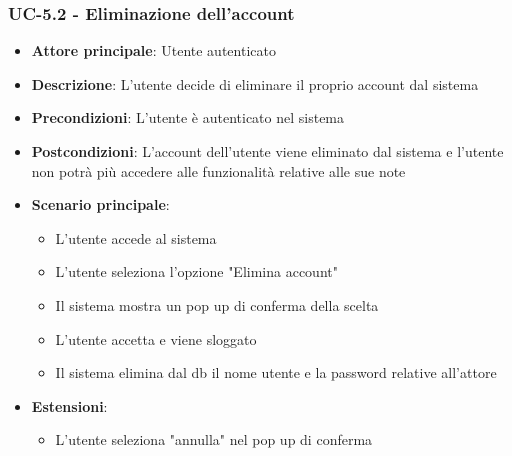 \documentclass[11pt,a4paper]{article}
\begin{document}
\subsubsection{UC-5.2 - Eliminazione dell'account}
\begin{itemize}
    \item \textbf{Attore principale}: Utente autenticato
    \item \textbf{Descrizione}: L'utente decide di eliminare il proprio account dal sistema
    \item \textbf{Precondizioni}: L'utente è autenticato nel sistema
    \item \textbf{Postcondizioni}: L'account dell'utente viene eliminato dal sistema e l'utente non potrà più accedere alle funzionalità relative alle sue note
    \item \textbf{Scenario principale}:
        \begin{itemize}
            \item L'utente accede al sistema
            \item L'utente seleziona l'opzione "Elimina account"
            \item Il sistema mostra un pop up di conferma della scelta
            \item L'utente accetta e viene sloggato
            \item Il sistema elimina dal db il nome utente e la password relative all'attore
        \end{itemize}
    \item \textbf{Estensioni}:
        \begin{itemize}
            \item L'utente seleziona "annulla" nel pop up di conferma
        \end{itemize}
\end{itemize}
\end{document}

